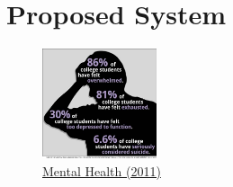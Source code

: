 \documentclass[a4paper,11pt]{article} %
\begin{document}
\newpage

\tableofcontents
\newpage

\section{Proposed System}

\begin{figure}
  \centering
  \includegraphics[width=0.3\textwidth]{img/mental-health.png}
  \caption{\label{fig:frog1}\href{https://www.change.org/p/university-students-mental-health-days-for-college-students}{Mental Health (2011)}}
\end{figure}
\end{document}
